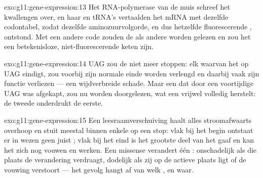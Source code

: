 \begin{solution}{exo:g11:gene-expression:13}
Het RNA-polymerase van de muis schreef het kwallengen over, en haar
 en tRNA's vertaalden het mRNA met dezelfde codontabel, zodat
dezelfde aminozuurvolgorde, en dus hetzelfde fluorescerende ,
ontstond. Met een andere code zouden de  als andere 
worden gelezen en zou het  een betekenisloze, niet-fluorescerende
keten zijn.
\end{solution}

\begin{solution}{exo:g11:gene-expression:14}
UAG zou de  niet meer stoppen: elk  waarvan het  op UAG
eindigt, zou voorbij zijn normale einde worden verlengd en daarbij vaak
zijn functie verliezen --- een wijdverbreide schade. Maar een  dat
door een voortijdige UAG was afgekapt, zou nu worden doorgelezen, wat een
vrijwel volledig  herstelt: de tweede  onderdrukt de eerste.
\end{solution}

\begin{solution}{exo:g11:gene-expression:15}
Een leesraamverschuiving haalt alles stroomafwaarts overhoop en stuit
meestal binnen enkele  op een stop: vlak bij het begin ontstaat er
in wezen geen juist ; vlak bij het eind is het grootste deel van het
 gaaf en kan het zich nog vouwen en werken. Een missense verandert
één : onschadelijk als die plaats de verandering verdraagt,
dodelijk als zij op de actieve plaats ligt of de vouwing verstoort --- het
gevolg hangt af van welk , en waar.
\end{solution}

